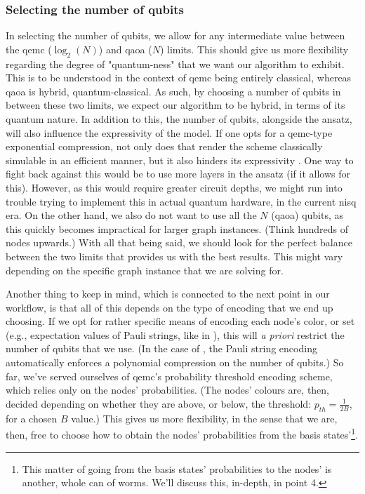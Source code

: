 \subsubsection*{Selecting the number of qubits}
In selecting the number of qubits, we allow for any intermediate value between the \acrshort{qemc} \cite{tenecohen2023variational} ($\log_2{(N)}$) and \acrshort{qaoa} \cite{farhi2014quantum} ($N$) limits. This should give us more flexibility regarding the degree of "quantum-ness" that we want our algorithm to exhibit. This is to be understood in the context of \acrshort{qemc} being entirely classical, whereas \acrshort{qaoa} is hybrid, quantum-classical. As such, by choosing a number of qubits in between these two limits, we expect our algorithm to be hybrid, in terms of its quantum nature. In addition to this, the number of qubits, alongside the ansatz, will also influence the expressivity of the model. If one opts for a \acrshort{qemc}-type exponential compression, not only does that render the scheme classically simulable in an efficient manner, but it also hinders its expressivity \cite{tenecohen2023variational}. One way to fight back against this would be to use more layers in the ansatz (if it allows for this). However, as this would require greater circuit depths, we might run into trouble trying to implement this in actual quantum hardware, in the current \acrshort{nisq} era. On the other hand, we also do not want to use all the $N$ (\acrshort{qaoa}) qubits, as this quickly becomes impractical for larger graph instances. (Think hundreds of nodes upwards.) With all that being said, we should look for the perfect balance between the two limits that provides us with the best results. This might vary depending on the specific graph instance that we are solving for.

Another thing to keep in mind, which is connected to the next point in our workflow, is that all of this depends on the type of encoding that we end up choosing. If we opt for rather specific means of encoding each node's color, or set (e.g., expectation values of Pauli strings, like in \cite{sciorilli2024largescale}), this will \textit{a priori} restrict the number of qubits that we use. (In the case of \cite{sciorilli2024largescale}, the Pauli string encoding automatically enforces a polynomial compression on the number of qubits.) So far, we've served ourselves of \acrshort{qemc}'s probability threshold encoding scheme, which relies only on the nodes' probabilities. (The nodes' colours are, then, decided depending on whether they are above, or below, the threshold: $p_{th} = \frac{1}{2B}$, for a chosen $B$ value.) This gives us more flexibility, in the sense that we are, then, free to choose how to obtain the nodes' probabilities from the basis states'\footnote{This matter of going from the basis states' probabilities to the nodes' is another, whole can of worms. We'll discuss this, in-depth, in point 4.}.

